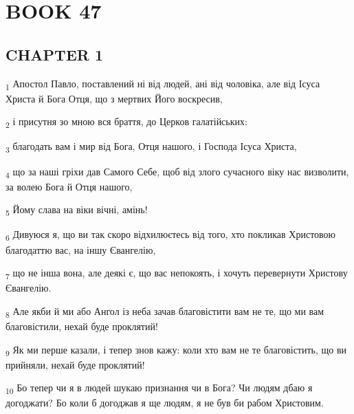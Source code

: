 \section{BOOK 47}
\subsection{CHAPTER 1}
\begin{tcolorbox}
\textsubscript{1} Апостол Павло, поставлений ні від людей, ані від чоловіка, але від Ісуса Христа й Бога Отця, що з мертвих Його воскресив,
\end{tcolorbox}
\begin{tcolorbox}
\textsubscript{2} і присутня зо мною вся браття, до Церков галатійських:
\end{tcolorbox}
\begin{tcolorbox}
\textsubscript{3} благодать вам і мир від Бога, Отця нашого, і Господа Ісуса Христа,
\end{tcolorbox}
\begin{tcolorbox}
\textsubscript{4} що за наші гріхи дав Самого Себе, щоб від злого сучасного віку нас визволити, за волею Бога й Отця нашого,
\end{tcolorbox}
\begin{tcolorbox}
\textsubscript{5} Йому слава на віки вічні, амінь!
\end{tcolorbox}
\begin{tcolorbox}
\textsubscript{6} Дивуюся я, що ви так скоро відхилюєтесь від того, хто покликав Христовою благодаттю вас, на іншу Євангелію,
\end{tcolorbox}
\begin{tcolorbox}
\textsubscript{7} що не інша вона, але деякі є, що вас непокоять, і хочуть перевернути Христову Євангелію.
\end{tcolorbox}
\begin{tcolorbox}
\textsubscript{8} Але якби й ми або Ангол із неба зачав благовістити вам не те, що ми вам благовістили, нехай буде проклятий!
\end{tcolorbox}
\begin{tcolorbox}
\textsubscript{9} Як ми перше казали, і тепер знов кажу: коли хто вам не те благовістить, що ви прийняли, нехай буде проклятий!
\end{tcolorbox}
\begin{tcolorbox}
\textsubscript{10} Бо тепер чи я в людей шукаю признання чи в Бога? Чи людям дбаю я догоджати? Бо коли б догоджав я ще людям, я не був би рабом Христовим.
\end{tcolorbox}
